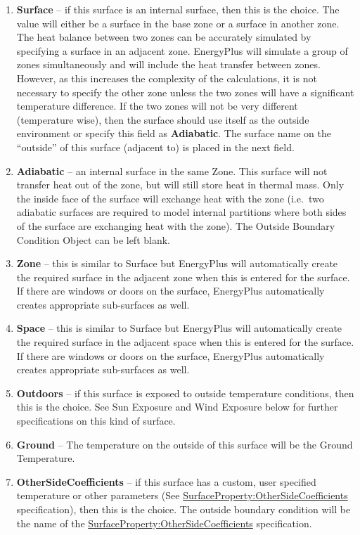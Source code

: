 \begin{enumerate}
  \item
    \textbf{Surface} -- if this surface is an internal surface, then this is the choice. The value will either be a surface in the base zone or a surface in another zone. The heat balance between two zones can be accurately simulated by specifying a surface in an adjacent zone. EnergyPlus will simulate a group of zones simultaneously and will include the heat transfer between zones. However, as this increases the complexity of the calculations, it is not necessary to specify the other zone unless the two zones will have a significant temperature difference. If the two zones will not be very different (temperature wise), then the surface should use itself as the outside environment or specify this field as \textbf{Adiabatic}. The surface name on the ``outside'' of this surface (adjacent to) is placed in the next field.
  \item
    \textbf{Adiabatic} -- an internal surface in the same Zone. This surface will not transfer heat out of the zone, but will still store heat in thermal mass. Only the inside face of the surface will exchange heat with the zone (i.e.~two adiabatic surfaces are required to model internal partitions where both sides of the surface are exchanging heat with the zone). The Outside Boundary Condition Object can be left blank.
  \item
    \textbf{Zone} -- this is similar to Surface but EnergyPlus will automatically create the required surface in the adjacent zone when this is entered for the surface. If there are windows or doors on the surface, EnergyPlus automatically creates appropriate sub-surfaces as well.
  \item
    \textbf{Space} -- this is similar to Surface but EnergyPlus will automatically create the required surface in the adjacent space when this is entered for the surface. If there are windows or doors on the surface, EnergyPlus automatically creates appropriate sub-surfaces as well.
  \item
    \textbf{Outdoors} -- if this surface is exposed to outside temperature conditions, then this is the choice. See Sun Exposure and Wind Exposure below for further specifications on this kind of surface.
  \item
    \textbf{Ground} -- The temperature on the outside of this surface will be the Ground Temperature.
  \item
    \textbf{OtherSideCoefficients} -- if this surface has a custom, user specified temperature or other parameters (See \hyperref[surfacepropertyothersidecoefficients]{SurfaceProperty:OtherSideCoefficients} specification), then this is the choice. The outside boundary condition will be the name of the \hyperref[surfacepropertyothersidecoefficients]{SurfaceProperty:OtherSideCoefficients} specification.

\end{enumerate}

